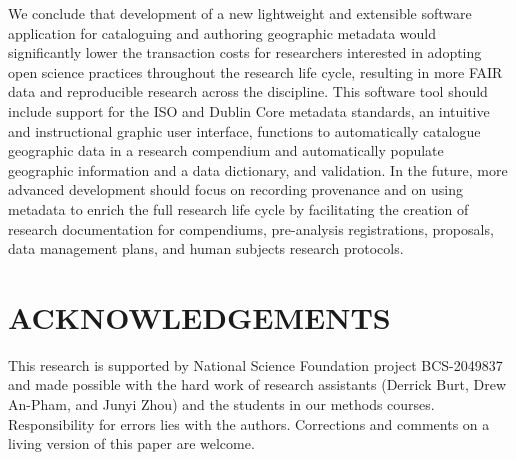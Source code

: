\documentclass{isprs} %
\begin{document}
We conclude that development of a new lightweight and extensible software application for cataloguing and authoring geographic metadata would significantly lower the transaction costs for researchers interested in adopting open science practices throughout the research life cycle, resulting in more FAIR data and reproducible research across the discipline. 
This software tool should include support for the ISO and Dublin Core metadata standards, an intuitive and instructional graphic user interface, functions to automatically catalogue geographic data in a research compendium and automatically populate geographic information and a data dictionary, and validation.
In the future, more advanced development should focus on recording provenance and on using metadata to enrich the full research life cycle by facilitating the creation of research documentation for compendiums, pre-analysis registrations, proposals, data management plans, and human subjects research protocols.


\section*{ACKNOWLEDGEMENTS}\label{ACKNOWLEDGEMENTS}
This research is supported by National Science Foundation project BCS-2049837 and made possible with the hard work of research assistants (Derrick Burt, Drew An-Pham, and Junyi Zhou) and the students in our methods courses.
Responsibility for errors lies with the authors. Corrections and comments on a living version of this paper \citep{foss4g2022} are welcome.

{
	\begin{spacing}{1.17}
		\normalsize
		\renewcommand\refname{REFERENCES}
		 
	\end{spacing}
}
\end{document}
